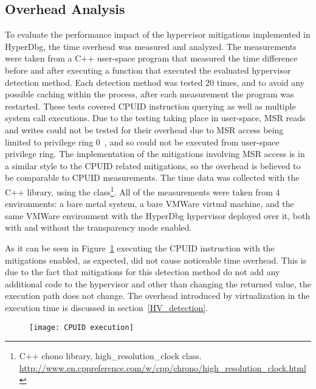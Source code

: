 \subsection{Overhead Analysis}
To evaluate the performance impact of the hypervisor mitigations implemented in HyperDbg, the time overhead was measured and analyzed. 
The measurements were taken from a C++ user-space program that measured the time difference before and after executing a function that executed the evaluated hypervisor detection method. 
Each detection method was tested 20 times, and to avoid any possible caching within the process, after each measurement the program was restarted. 
These tests covered CPUID instruction querying as well as multiple system call executions. Due to the testing taking place in user-space, 
MSR reads and writes could not be tested for their overhead due to MSR access being limited to privilege ring 0~\cite[Volume 2B]{Intel-SDM2025}, and so could not be executed from user-space privilege ring.
The implementation of the mitigations involving MSR access is in a similar style to the CPUID related mitigations, so the overhead is believed to be comparable to CPUID measurements.
The time data was collected with the C++  library, 
using the  class\footnote{C++ chono library, high\_resolution\_clock class. \url{http://www.en.cppreference.com/w/cpp/chrono/high_resolution_clock.html}}.
All of the measurements were taken from 4 environments: a bare metal system, a bare VMWare virtual machine, and the same 
VMWare environment with the HyperDbg hypervisor deployed over it, both with and without the transparency mode enabled.

As it can be seen in Figure~\ref{fig:cpuid_exec_time} executing the CPUID instruction with the mitigations enabled, as expected, did not cause noticeable time overhead. 
This is due to the fact that mitigations for this detection method do not add any additional code to the hypervisor and other than changing the returned value, the execution path does not change.
The overhead introduced by virtualization in the execution time is discussed in section~\ref{HV_detection}.
\begin{figure}[tbh]
    \texttt{[image: CPUID execution]} %
    \label{fig:cpuid_exec_time}
\end{figure}

